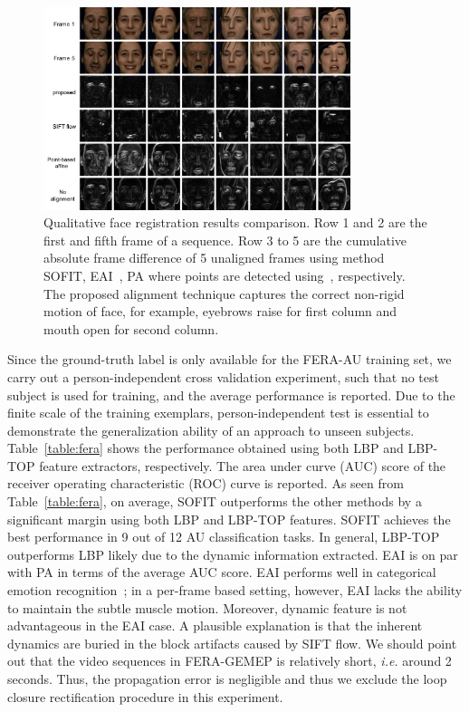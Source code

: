 \documentclass[review]{elsarticle}
\begin{document}
\begin{figure}[t]
	\centering
	\includegraphics[width=0.8\textwidth]{fig/fera_diff.png}
	\caption{Qualitative face registration results comparison. Row 1 and 2 are the first and fifth frame of a sequence. Row 3 to 5 are the cumulative absolute frame difference of 5 unaligned frames using method SOFIT, EAI~\cite{Yang_SMCB12}, PA where points are detected using~\cite{Tadas_ECCV14}, respectively. The proposed alignment technique captures the correct non-rigid motion of face, for example, eyebrows raise for first column and mouth open for second column.}
	\label{fig:fera_diff}
\end{figure}


Since the ground-truth label is only available for the FERA-AU training set, we carry out a person-independent cross validation experiment, such that no test subject is used for training, and the average performance is reported. Due to the finite scale of the training exemplars, person-independent test is essential to demonstrate the generalization ability of an approach to unseen subjects. Table~\ref{table:fera} shows the performance obtained using both LBP and LBP-TOP feature extractors, respectively. The area under curve (AUC) score of the receiver operating characteristic (ROC) curve is reported. As seen from Table~\ref{table:fera}, on average, SOFIT outperforms the other methods by a significant margin using both LBP and LBP-TOP features. SOFIT achieves the best performance in 9 out of 12 AU classification tasks. In general, LBP-TOP outperforms LBP likely due to the dynamic information extracted. EAI is on par with PA in terms of the average AUC score. EAI performs well in categorical emotion recognition~\cite{Yang_SMCB12}; in a per-frame based setting, however, EAI lacks the ability to maintain the subtle muscle motion. Moreover, dynamic feature is not advantageous in the EAI case. A plausible explanation is that the inherent dynamics are buried in the block artifacts caused by SIFT flow. We should point out that the video sequences in FERA-GEMEP is relatively short, \textit{i.e.} around 2 seconds. Thus, the propagation error is negligible and thus we exclude the loop closure rectification procedure in this experiment. 
\end{document}
